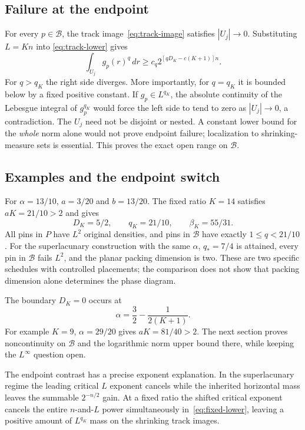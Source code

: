 \subsection{Failure at the endpoint}
For every $p\in\mathcal B$, the track image~\eqref{eq:track-image}
satisfies $|U_j|\to0$. Substituting $L=Kn$ into
\eqref{eq:track-lower} gives
\begin{equation}\label{eq:fixed-lower}
 \int_{U_j}g_p(r)^q\,dr
 \geq c_q 2^{[qD_K-c(K+1)]n}.
\end{equation}
For $q>q_K$ the right side diverges. More importantly, for $q=q_K$
it is bounded below by a fixed positive constant. If $g_p\in L^{q_K}$,
the absolute continuity of the Lebesgue integral of $g_p^{q_K}$ would
force the left side to tend to zero as $|U_j|\to0$, a contradiction.
The $U_j$ need not be disjoint or nested. A constant lower bound for the
\emph{whole} norm alone would not prove endpoint failure; localization to
shrinking-measure sets is essential. This proves the exact open range on
$\mathcal B$.

\subsection{Examples and the endpoint switch}
For $\alpha=13/10$, $a=3/20$ and $b=13/20$. The fixed ratio $K=14$
satisfies $aK=21/10>2$ and gives
\[
 D_K=5/2,\qquad q_K=21/10,\qquad\beta_K=55/31.
\]
All pins in $P$ have $L^2$ original densities, and pins in $\mathcal B$
have exactly $1\leq q<21/10$. For the superlacunary construction with
the same $\alpha$, $q_*=7/4$ is attained, every pin in $\mathcal B$
fails $L^2$, and the planar packing dimension is two. These are two
specific schedules with controlled placements; the comparison does not
show that packing dimension alone determines the phase diagram.

The boundary $D_K=0$ occurs at
\begin{equation}\label{eq:fixed-boundary-alpha}
 \alpha=\frac32-\frac1{2(K+1)}.
\end{equation}
For example $K=9$, $\alpha=29/20$ gives $aK=81/40>2$.
The next section proves noncontinuity on $\mathcal B$ and the logarithmic
norm upper bound there, while keeping the $L^\infty$ question open.

The endpoint contrast has a precise exponent explanation. In the
superlacunary regime the leading critical $L$ exponent cancels while the
inherited horizontal mass leaves the summable $2^{-n/2}$ gain.
At a fixed ratio the shifted critical exponent cancels the entire
$n$-and-$L$ power simultaneously in~\eqref{eq:fixed-lower}, leaving a
positive amount of $L^{q_K}$ mass on the shrinking track images.
